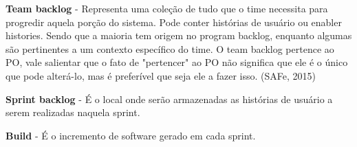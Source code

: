 \textbf{Team backlog} - Representa uma coleção de tudo que o time necessita para progredir aquela porção do sistema. Pode conter histórias de usuário ou enabler histories. Sendo que a maioria tem origem no program backlog, enquanto algumas são pertinentes a um contexto específico do time. O team backlog pertence ao PO, vale salientar que o fato de "pertencer" ao PO não significa que ele é o único que pode alterá-lo, mas é preferível que seja ele a fazer isso. (SAFe, 2015)

\textbf{Sprint backlog} - É o local onde serão armazenadas as histórias de usuário a serem realizadas naquela sprint.

\textbf{Build} - É o incremento de software gerado em cada sprint.